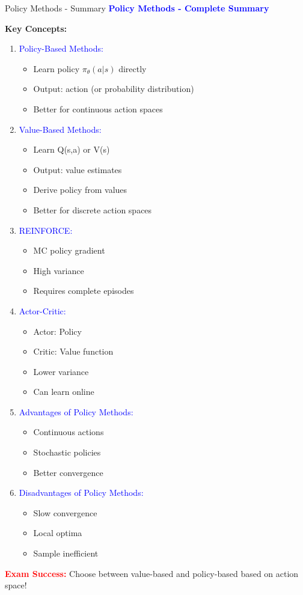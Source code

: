 \documentclass[8pt]{beamer}
\begin{document}
\begin{frame}{Policy Methods - Summary}
\fontsize{6.5}{7.5}\selectfont
\textcolor{blue}{\textbf{Policy Methods - Complete Summary}}

\textbf{Key Concepts:}
\begin{enumerate}
\item \textcolor{blue}{Policy-Based Methods:}
\begin{itemize}
\item Learn policy $\pi_\theta(a|s)$ directly
\item Output: action (or probability distribution)
\item Better for continuous action spaces
\end{itemize}

\item \textcolor{blue}{Value-Based Methods:}
\begin{itemize}
\item Learn Q(s,a) or V(s)
\item Output: value estimates
\item Derive policy from values
\item Better for discrete action spaces
\end{itemize}

\item \textcolor{blue}{REINFORCE:}
\begin{itemize}
\item MC policy gradient
\item High variance
\item Requires complete episodes
\end{itemize}

\item \textcolor{blue}{Actor-Critic:}
\begin{itemize}
\item Actor: Policy
\item Critic: Value function
\item Lower variance
\item Can learn online
\end{itemize}

\item \textcolor{blue}{Advantages of Policy Methods:}
\begin{itemize}
\item Continuous actions
\item Stochastic policies
\item Better convergence
\end{itemize}

\item \textcolor{blue}{Disadvantages of Policy Methods:}
\begin{itemize}
\item Slow convergence
\item Local optima
\item Sample inefficient
\end{itemize}
\end{enumerate}

\textcolor{red}{\textbf{Exam Success:}} Choose between value-based and policy-based based on action space!
\end{frame}
\end{document}
